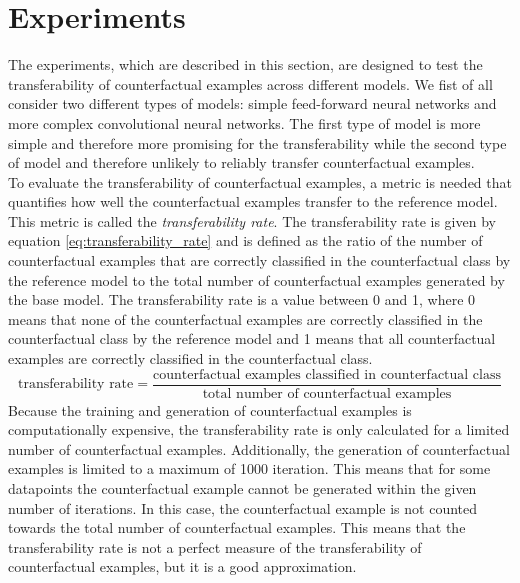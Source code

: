 \documentclass{article}
\begin{document}
\section{Experiments}
The experiments, which are described in this section, are designed to test the transferability of counterfactual examples across different models. We fist of all consider two different types of models: simple feed-forward neural networks and more complex convolutional neural networks. The first type of model is more simple and therefore more promising for the transferability while the second type of model and therefore unlikely to reliably transfer counterfactual examples.\\
To evaluate the transferability of counterfactual examples, a metric is needed that quantifies how well the counterfactual examples transfer to the reference model. This metric is called the \textit{transferability rate}. The transferability rate is given by equation \ref{eq:transferability_rate} and is defined as the ratio of the number of counterfactual examples that are correctly classified in the counterfactual class by the reference model to the total number of counterfactual examples generated by the base model. The transferability rate is a value between 0 and 1, where 0 means that none of the counterfactual examples are correctly classified in the counterfactual class by the reference model and 1 means that all counterfactual examples are correctly classified in the counterfactual class.\\
\begin{equation}
    \text{transferability rate} = \frac{\text{counterfactual examples classified in counterfactual class}}{\text{total number of counterfactual examples}}
    \label{eq:transferability_rate}
\end{equation}
Because the training and generation of counterfactual examples is computationally expensive, the transferability rate is only calculated for a limited number of counterfactual examples. Additionally, the generation of counterfactual examples is limited to a maximum of 1000 iteration. This means that for some datapoints the counterfactual example cannot be generated within the given number of iterations. In this case, the counterfactual example is not counted towards the total number of counterfactual examples. This means that the transferability rate is not a perfect measure of the transferability of counterfactual examples, but it is a good approximation.\\
\end{document}
